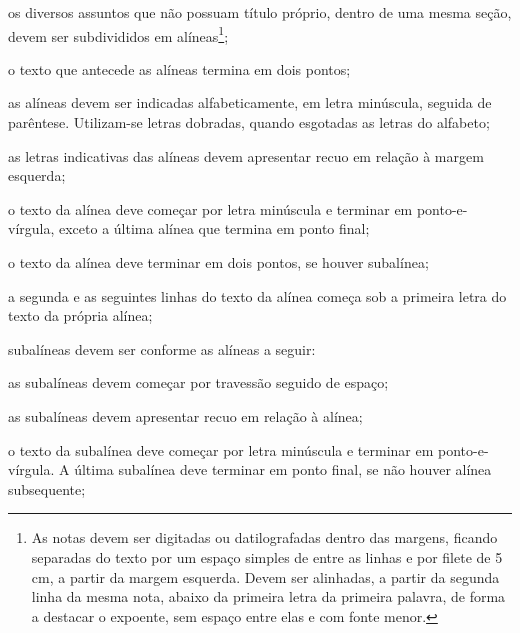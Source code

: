 \begin{alineas}

  \item os diversos assuntos que não possuam título próprio, dentro de uma mesma
  seção, devem ser subdivididos em alíneas\footnote{As notas devem ser digitadas ou datilografadas
  dentro das margens, ficando separadas do texto por um espaço simples de entre as
  linhas e por filete de 5 cm, a partir da margem esquerda. Devem ser
  alinhadas, a partir da segunda linha da mesma nota, abaixo da primeira letra
  da primeira palavra, de forma a destacar o expoente, sem espaço entre elas e
  com fonte menor. }; 
  
  \item o texto que antecede as alíneas termina em dois pontos;
  \item as alíneas devem ser indicadas alfabeticamente, em letra minúscula,
  seguida de parêntese. Utilizam-se letras dobradas, quando esgotadas as
  letras do alfabeto;

  \item as letras indicativas das alíneas devem apresentar recuo em relação à
  margem esquerda;

  \item o texto da alínea deve começar por letra minúscula e terminar em
  ponto-e-vírgula, exceto a última alínea que termina em ponto final;

  \item o texto da alínea deve terminar em dois pontos, se houver subalínea;

  \item a segunda e as seguintes linhas do texto da alínea começa sob a
  primeira letra do texto da própria alínea;
  
  \item subalíneas \cite[4.3]{NBR6024:2012} devem ser conforme as alíneas a
  seguir:

  \begin{alineas}
     \item as subalíneas devem começar por travessão seguido de espaço;

     \item as subalíneas devem apresentar recuo em relação à alínea;

     \item o texto da subalínea deve começar por letra minúscula e terminar em
     ponto-e-vírgula. A última subalínea deve terminar em ponto final, se não
     houver alínea subsequente;


\end{alineas}
\end{alineas}
